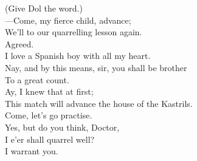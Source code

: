 \documentclass[a4paper,oneside,12pt]{memoir}
\begin{document}
\begin{drama*}
\subtlespeaks (Give Dol the word.)\\
 ---Come, my fierce child, advance;\\
We'll to our quarrelling lesson again.\\
\kastrilspeaks {} Agreed.\\
I love a Spanish boy with all my heart.\\
\subtlespeaks Nay, and by this means, sir, you shall be brother\\
To a great count.\\
\kastrilspeaks {} Ay, I knew that at first;\\
This match will advance the house of the Kastrils.\\
\subtlespeaks Come, let's go practise.\\
\kastrilspeaks {} Yes, but do you think, Doctor,\\
I e'er shall quarrel well?\\
\subtlespeaks {} I warrant you.\\

\scene


\end{drama*}
\end{document}
